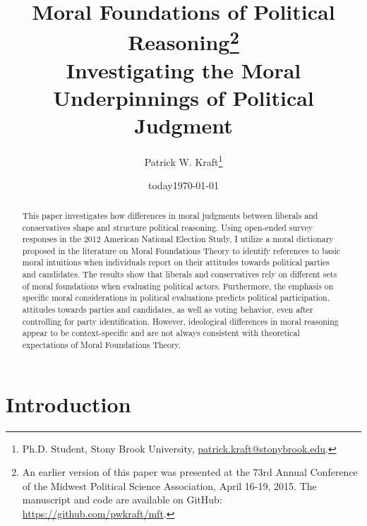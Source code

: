 \documentclass[12pt]{article}
\author{Patrick W. Kraft\footnote{Ph.D. Student, Stony Brook University, \href{mailto:patrick.kraft@stonybrook.edu}{patrick.kraft@stonybrook.edu}.
}}
\date{today}
\title{Moral Foundations of Political Reasoning\footnote{An earlier version of this paper was presented at the 73rd Annual Conference of the Midwest Political Science Association, April 16-19, 2015. The manuscript and code are available on GitHub: \url{https://github.com/pwkraft/mft}.}\\
\large{Investigating the Moral Underpinnings of Political Judgment}}
\date{\today}
\begin{document}
\maketitle
\onehalfspacing

\begin{abstract}
This paper investigates how differences in moral judgments between liberals and conservatives shape and structure political reasoning. Using open-ended survey responses in the 2012 American National Election Study, I utilize a moral dictionary proposed in the literature on Moral Foundations Theory to identify references to basic moral intuitions when individuals report on their attitudes towards political parties and candidates. The results show that liberals and conservatives rely on different sets of moral foundations when evaluating political actors. Furthermore, the emphasis on specific moral considerations in political evaluations predicts political participation, attitudes towards parties and candidates, as well as voting behavior, even after controlling for party identification. However, ideological differences in moral reasoning appear to be context-specific and are not always consistent with theoretical expectations of Moral Foundations Theory.

\end{abstract}
\newpage


\section{Introduction}
\end{document}
